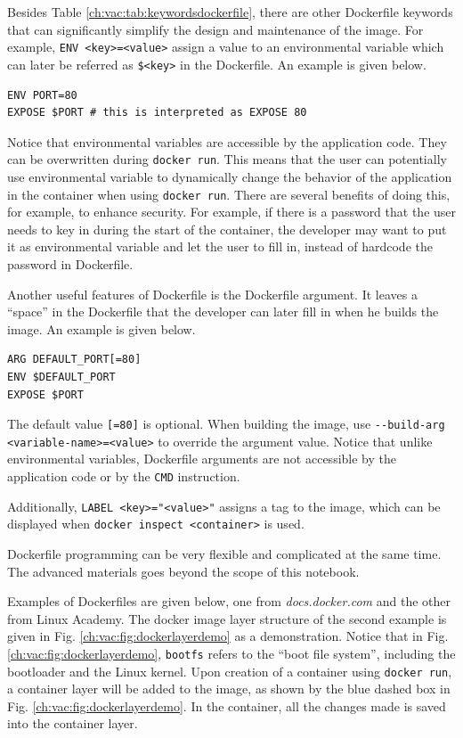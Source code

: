 Besides Table \ref{ch:vac:tab:keywordsdockerfile}, there are other Dockerfile keywords that can significantly simplify the design and maintenance of the image. For example, \verb|ENV <key>=<value>| assign a value to an environmental variable which can later be referred as \verb|$<key>| in the Dockerfile. An example is given below.
\begin{lstlisting}
ENV PORT=80
EXPOSE $PORT # this is interpreted as EXPOSE 80
\end{lstlisting}
Notice that environmental variables are accessible by the application code. They can be overwritten during \verb|docker run|. This means that the user can potentially use environmental variable to dynamically change the behavior of the application in the container when using \verb|docker run|. There are several benefits of doing this, for example, to enhance security. For example, if there is a password that the user needs to key in during the start of the container, the developer may want to put it as environmental variable and let the user to fill in, instead of hardcode the password in Dockerfile.

Another useful features of Dockerfile is the Dockerfile argument. It leaves a ``space'' in the Dockerfile that the developer can later fill in when he builds the image. An example is given below.
\begin{lstlisting}
ARG DEFAULT_PORT[=80]
ENV $DEFAULT_PORT
EXPOSE $PORT
\end{lstlisting}
The default value \verb|[=80]| is optional. When building the image, use \verb|--build-arg <variable-name>=<value>| to override the argument value. Notice that unlike environmental variables, Dockerfile arguments are not accessible by the application code or by the \verb|CMD| instruction.

Additionally, \verb|LABEL <key>="<value>"| assigns a tag to the image, which can be displayed when \verb|docker inspect <container>| is used.

Dockerfile programming can be very flexible and complicated at the same time. The advanced materials goes beyond the scope of this notebook.

Examples of Dockerfiles are given below, one from \textit{docs.docker.com} and the other from Linux Academy. The docker image layer structure of the second example is given in Fig. \ref{ch:vac:fig:dockerlayerdemo} as a demonstration. Notice that in Fig. \ref{ch:vac:fig:dockerlayerdemo}, \verb|bootfs| refers to the ``boot file system'', including the bootloader and the Linux kernel. Upon creation of a container using \verb|docker run|, a container layer will be added to the image, as shown by the blue dashed box in Fig. \ref{ch:vac:fig:dockerlayerdemo}. In the container, all the changes made is saved into the container layer.

